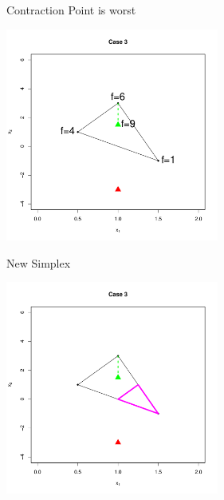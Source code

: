 \documentclass[10pt]{beamer}
\begin{document}
                                                                                              \begin{frame}{Contraction Point is worst}
                                                                                                \begin{center}
                                                                                                  \includegraphics[height=7cm]{RCode/nmshrink1.pdf}
                                                                                                \end{center}
                                                                                              \end{frame}
                                                                                              \begin{frame}{New Simplex}
                                                                                                \begin{center}
                                                                                                  \includegraphics[height=7cm]{RCode/nmshrink2.pdf}
                                                                                                \end{center}
                                                                                              \end{frame}
\end{document}
